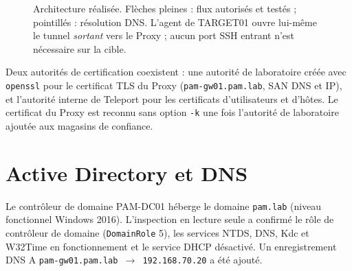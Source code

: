 \documentclass[11pt,a4paper]{report}
\begin{document}
\begin{figure}[htbp]
\centering
{}
\caption{Architecture réalisée. Flèches pleines : flux autorisés et testés ; pointillés : résolution DNS. L'agent de TARGET01 ouvre lui-même le tunnel \emph{sortant} vers le Proxy ; aucun port SSH entrant n'est nécessaire sur la cible.}
\label{fig:archi-reelle}
\end{figure}

Deux autorités de certification coexistent : une autorité de laboratoire créée avec \texttt{openssl} pour le certificat TLS du Proxy (\texttt{pam-gw01.pam.lab}, SAN DNS et IP), et l'autorité interne de Teleport pour les certificats d'utilisateurs et d'hôtes. Le certificat du Proxy est reconnu sans option \texttt{-k} une fois l'autorité de laboratoire ajoutée aux magasins de confiance.

\section{Active Directory et DNS}
Le contrôleur de domaine PAM-DC01 héberge le domaine \texttt{pam.lab} (niveau fonctionnel Windows 2016). L'inspection en lecture seule a confirmé le rôle de contrôleur de domaine (\texttt{DomainRole} 5), les services NTDS, DNS, Kdc et W32Time en fonctionnement et le service DHCP désactivé. Un enregistrement DNS A \texttt{pam-gw01.pam.lab $\rightarrow$ 192.168.70.20} a été ajouté.
\end{document}
